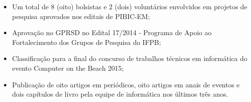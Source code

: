\begin{itemize}

\item Um total de 8 (oito) bolsistas e 2 (dois) voluntários envolvidos em projetos de pesquisa aprovados nos editais de PIBIC-EM;

\item Aprovação no GPRSD no Edital 17/2014 - Programa de Apoio ao Fortalecimento dos Grupos de Pesquisa do IFPB;

\item Classifica\c{c}\~ao para a final do concurso de trabalhos t\'ecnicos em inform\'atica do evento Computer on the Beach 2015;

\item Publicação de oito artigos em peri\'odicos, oito artigos em anais de eventos e dois cap\'itulos de livro pela equipe de informática nos últimos três anos.

\end{itemize}



